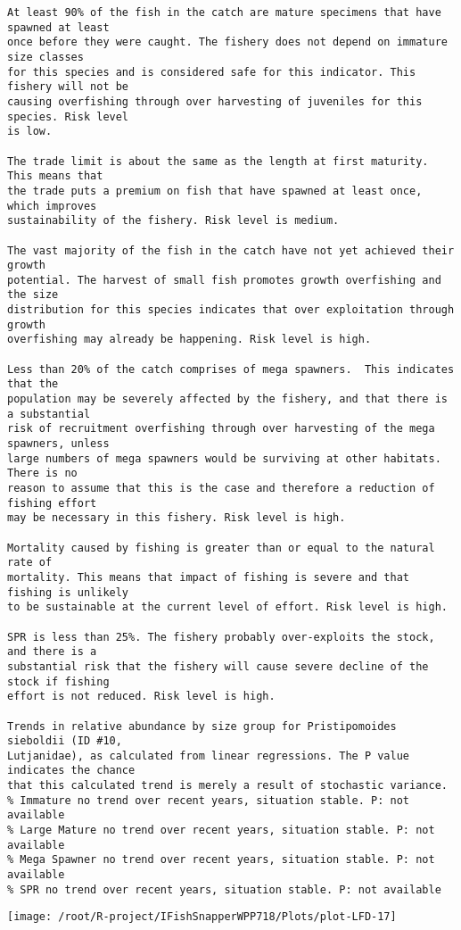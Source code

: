 \documentclass{report}\usepackage[]{graphicx}\usepackage[]{color}
\makeatletter
\def\maxwidth{ %
  \ifdim\Gin@nat@width>\linewidth
    \linewidth
  \else
    \Gin@nat@width
  \fi
}
\newenvironment{kframe}{%
 \def\at@end@of@kframe{}%
 \ifinner\ifhmode%
  \def\at@end@of@kframe{\end{minipage}}%
  \begin{minipage}{\columnwidth}%
 \fi\fi%
 \def\FrameCommand##1{\hskip\@totalleftmargin \hskip-\fboxsep
 \colorbox{shadecolor}{##1}\hskip-\fboxsep
     \hskip-\linewidth \hskip-\@totalleftmargin \hskip\columnwidth}%
 \MakeFramed {\advance\hsize-\width
   \@totalleftmargin\z@ \linewidth\hsize
   \@setminipage}}%
 {\par\unskip\endMakeFramed%
 \at@end@of@kframe}
\newenvironment{knitrout}{}{} %
\makeatother
\begin{document}
\begin{knitrout}
\begin{kframe}
\begin{verbatim}
At least 90% of the fish in the catch are mature specimens that have spawned at least
once before they were caught. The fishery does not depend on immature size classes
for this species and is considered safe for this indicator. This fishery will not be
causing overfishing through over harvesting of juveniles for this species. Risk level
is low.

The trade limit is about the same as the length at first maturity.  This means that
the trade puts a premium on fish that have spawned at least once, which improves
sustainability of the fishery. Risk level is medium.

The vast majority of the fish in the catch have not yet achieved their growth
potential. The harvest of small fish promotes growth overfishing and the size
distribution for this species indicates that over exploitation through growth
overfishing may already be happening. Risk level is high.

Less than 20% of the catch comprises of mega spawners.  This indicates that the
population may be severely affected by the fishery, and that there is a substantial
risk of recruitment overfishing through over harvesting of the mega spawners, unless
large numbers of mega spawners would be surviving at other habitats. There is no
reason to assume that this is the case and therefore a reduction of fishing effort
may be necessary in this fishery. Risk level is high.
 
Mortality caused by fishing is greater than or equal to the natural rate of
mortality. This means that impact of fishing is severe and that fishing is unlikely
to be sustainable at the current level of effort. Risk level is high.
 
SPR is less than 25%. The fishery probably over-exploits the stock, and there is a
substantial risk that the fishery will cause severe decline of the stock if fishing
effort is not reduced. Risk level is high.
 
Trends in relative abundance by size group for Pristipomoides sieboldii (ID #10,
Lutjanidae), as calculated from linear regressions. The P value indicates the chance
that this calculated trend is merely a result of stochastic variance.
% Immature no trend over recent years, situation stable. P: not available
% Large Mature no trend over recent years, situation stable. P: not available
% Mega Spawner no trend over recent years, situation stable. P: not available
% SPR no trend over recent years, situation stable. P: not available
\end{verbatim}
\end{kframe}
\texttt{[image: /root/R-project/IFishSnapperWPP718/Plots/plot-LFD-17]} 


\end{knitrout}
\end{document}
